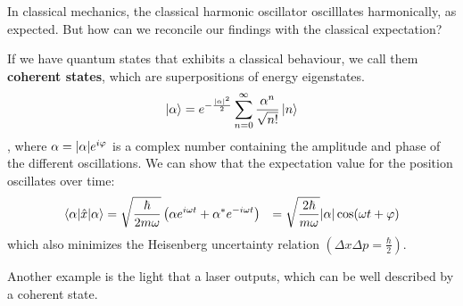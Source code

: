 In classical mechanics, the classical harmonic oscillator oscilllates harmonically, as expected. But how can we reconcile our findings with the classical expectation?

If we have quantum states that exhibits a classical behaviour, we call them \textbf{coherent states}, which are superpositions of energy eigenstates.
\begin{align*}
	\ket{\alpha} = e^{-\frac{\vert\alpha\vert^2}{2}} \sum_{n=0}^{\infty} \frac{\alpha^{n}}{\sqrt{n!}} \ket{n}
\end{align*}
, where $\alpha = \vert\alpha\vert e^{i \varphi}$ is a complex number containing the amplitude and phase of the different oscillations. We can show that the expectation value for the position oscillates over time:
\begin{align*}
	\braket{\alpha|\hat{x}|\alpha} &= \sqrt{\frac{\hbar}{2 m \omega}} \left(
		\alpha e^{i \omega t} + \alpha^*e^{-i \omega t}
	\right)
																 &= \sqrt{\frac{2 \hbar}{m \omega}} \vert\alpha\vert \cos(\omega t + \varphi)		
\end{align*}
which also minimizes the Heisenberg uncertainty relation $(\Delta x \Delta p = \frac{\hbar}{2})$. 

Another example is the light that a laser outputs, which can be well described by a coherent state.
